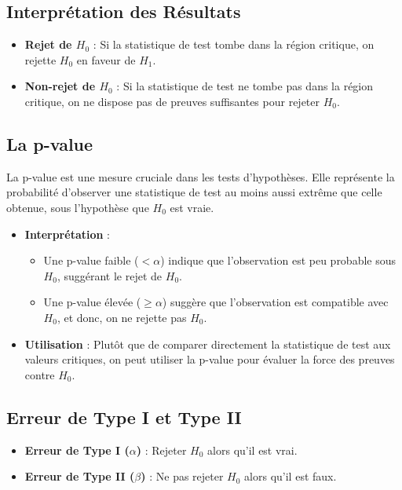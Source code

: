 \documentclass[14pt]{extarticle} %
\theoremstyle{definition}
\theoremstyle{plain}
\begin{document}
\subsection{Interprétation des Résultats}

\begin{itemize}
    \item \textbf{Rejet de \(H_0\)} : Si la statistique de test tombe dans la région critique, on rejette \(H_0\) en faveur de \(H_1\).
    \item \textbf{Non-rejet de \(H_0\)} : Si la statistique de test ne tombe pas dans la région critique, on ne dispose pas de preuves suffisantes pour rejeter \(H_0\).
\end{itemize}

\subsection{La p-value}

La p-value est une mesure cruciale dans les tests d'hypothèses. Elle représente la probabilité d'observer une statistique de test au moins aussi extrême que celle obtenue, sous l'hypothèse que \(H_0\) est vraie.

\begin{itemize}
    \item \textbf{Interprétation} : 
    \begin{itemize}
        \item Une p-value faible (\(< \alpha\)) indique que l'observation est peu probable sous \(H_0\), suggérant le rejet de \(H_0\).
        \item Une p-value élevée (\(\geq \alpha\)) suggère que l'observation est compatible avec \(H_0\), et donc, on ne rejette pas \(H_0\).
    \end{itemize}
    \item \textbf{Utilisation} : Plutôt que de comparer directement la statistique de test aux valeurs critiques, on peut utiliser la p-value pour évaluer la force des preuves contre \(H_0\).
\end{itemize}

\subsection{Erreur de Type I et Type II}

\begin{itemize}
    \item \textbf{Erreur de Type I (\(\alpha\))} : Rejeter \(H_0\) alors qu'il est vrai.
    \item \textbf{Erreur de Type II (\(\beta\))} : Ne pas rejeter \(H_0\) alors qu'il est faux.
\end{itemize}
\end{document}
